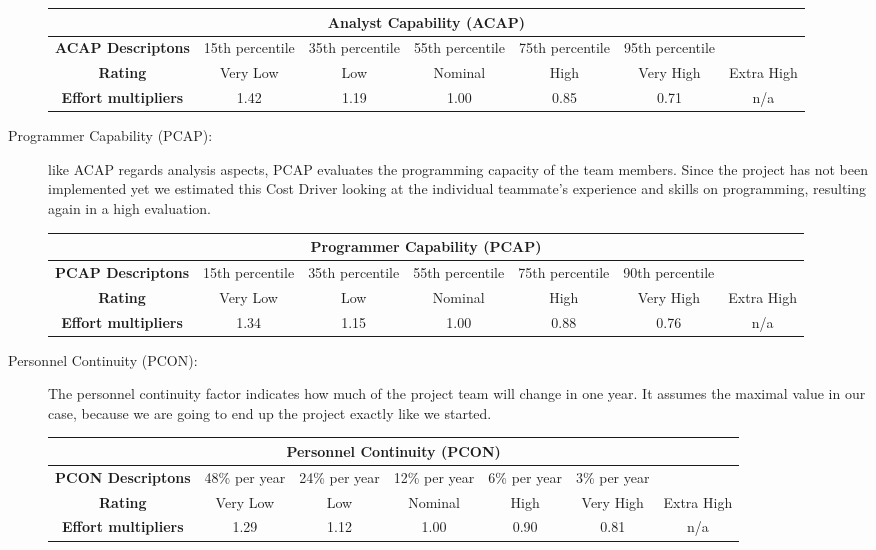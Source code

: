 \begin{description}
\begin{tabular}{ | c | c | c | c | c | c | c | }
\hline
         \multicolumn{7}{|c|}{\textbf{Analyst Capability (ACAP)}} \\ \hline  \hline
         	\textbf{ACAP Descriptons} & 15th percentile &35th percentile& 55th percentile& 75th percentile & 95th percentile&\\ \hline
	\textbf{Rating}&Very Low & Low & Nominal  & High & Very High &Extra High\\ \hline
	\textbf{Effort multipliers} & 1.42 & 1.19 & 1.00 & 0.85 & 0.71 & n/a \\ \hline
\end{tabular}

\item[Programmer Capability (PCAP):] like ACAP regards analysis aspects, PCAP evaluates the programming capacity of the team members. Since the project has not been implemented yet we estimated this Cost Driver looking at the individual teammate's experience and skills on programming, resulting again in a high evaluation.

\begin{tabular}{ | c | c | c | c | c | c | c | }
\hline
         \multicolumn{7}{|c|}{\textbf{Programmer Capability (PCAP)}} \\ \hline  \hline
         	\textbf{PCAP Descriptons} & 15th percentile &35th percentile& 55th percentile& 75th percentile & 90th percentile&\\ \hline
	\textbf{Rating}&Very Low & Low & Nominal  & High & Very High &Extra High\\ \hline
	\textbf{Effort multipliers} & 1.34 & 1.15& 1.00 & 0.88 & 0.76 & n/a \\ \hline
\end{tabular}

\item[Personnel Continuity (PCON):] The personnel continuity factor indicates how much of the project team will change in one year. It assumes the maximal value in our case, because we are going to end up the project exactly like we started.

\begin{tabular}{ | c | c | c | c | c | c | c | }
\hline
         \multicolumn{7}{|c|}{\textbf{Personnel Continuity (PCON)}} \\ \hline  \hline
         	\textbf{PCON Descriptons} & 48\% per year&24\% per year&12\% per year&6\% per year&3\% per year&\\ \hline
	\textbf{Rating}&Very Low & Low & Nominal  & High & Very High &Extra High\\ \hline
	\textbf{Effort multipliers} & 1.29 & 1.12& 1.00 & 0.90 & 0.81 & n/a \\ \hline
\end{tabular}


\end{description}
